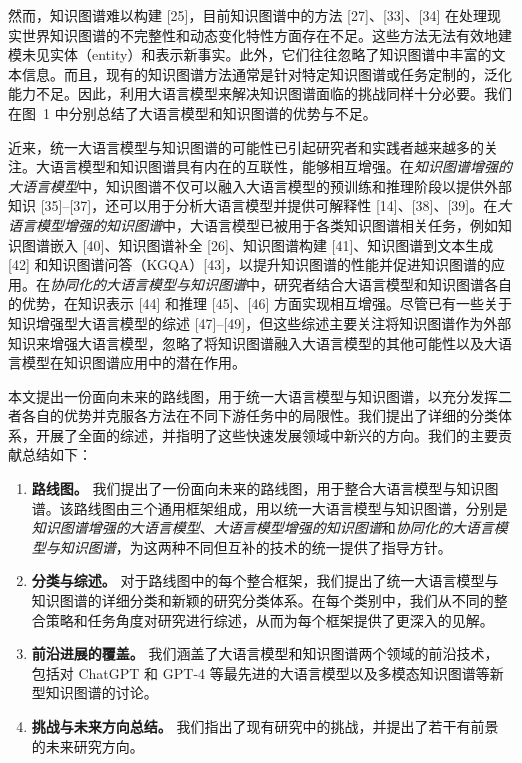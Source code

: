 \documentclass[11pt,UTF8,fontset=fandol]{ctexart}
\begin{document}
然而，知识图谱难以构建 [25]，目前知识图谱中的方法 [27]、[33]、[34] 在处理现实世界知识图谱的不完整性和动态变化特性方面存在不足。这些方法无法有效地建模未见实体（entity）和表示新事实。此外，它们往往忽略了知识图谱中丰富的文本信息。而且，现有的知识图谱方法通常是针对特定知识图谱或任务定制的，泛化能力不足。因此，利用大语言模型来解决知识图谱面临的挑战同样十分必要。我们在图~1 中分别总结了大语言模型和知识图谱的优势与不足。

近来，统一大语言模型与知识图谱的可能性已引起研究者和实践者越来越多的关注。大语言模型和知识图谱具有内在的互联性，能够相互增强。在\textit{知识图谱增强的大语言模型}中，知识图谱不仅可以融入大语言模型的预训练和推理阶段以提供外部知识 [35]--[37]，还可以用于分析大语言模型并提供可解释性 [14]、[38]、[39]。在\textit{大语言模型增强的知识图谱}中，大语言模型已被用于各类知识图谱相关任务，例如知识图谱嵌入 [40]、知识图谱补全 [26]、知识图谱构建 [41]、知识图谱到文本生成 [42] 和知识图谱问答（KGQA）[43]，以提升知识图谱的性能并促进知识图谱的应用。在\textit{协同化的大语言模型与知识图谱}中，研究者结合大语言模型和知识图谱各自的优势，在知识表示 [44] 和推理 [45]、[46] 方面实现相互增强。尽管已有一些关于知识增强型大语言模型的综述 [47]--[49]，但这些综述主要关注将知识图谱作为外部知识来增强大语言模型，忽略了将知识图谱融入大语言模型的其他可能性以及大语言模型在知识图谱应用中的潜在作用。

本文提出一份面向未来的路线图，用于统一大语言模型与知识图谱，以充分发挥二者各自的优势并克服各方法在不同下游任务中的局限性。我们提出了详细的分类体系，开展了全面的综述，并指明了这些快速发展领域中新兴的方向。我们的主要贡献总结如下：

\begin{enumerate}
    \item \textbf{路线图。} 我们提出了一份面向未来的路线图，用于整合大语言模型与知识图谱。该路线图由三个通用框架组成，用以统一大语言模型与知识图谱，分别是\textit{知识图谱增强的大语言模型}、\textit{大语言模型增强的知识图谱}和\textit{协同化的大语言模型与知识图谱}，为这两种不同但互补的技术的统一提供了指导方针。
    \item \textbf{分类与综述。} 对于路线图中的每个整合框架，我们提出了统一大语言模型与知识图谱的详细分类和新颖的研究分类体系。在每个类别中，我们从不同的整合策略和任务角度对研究进行综述，从而为每个框架提供了更深入的见解。
    \item \textbf{前沿进展的覆盖。} 我们涵盖了大语言模型和知识图谱两个领域的前沿技术，包括对 ChatGPT 和 GPT-4 等最先进的大语言模型以及多模态知识图谱等新型知识图谱的讨论。
    \item \textbf{挑战与未来方向总结。} 我们指出了现有研究中的挑战，并提出了若干有前景的未来研究方向。
\end{enumerate}
\end{document}
